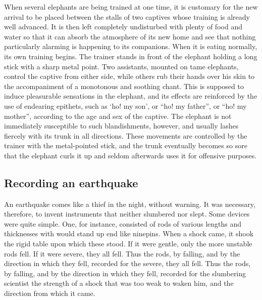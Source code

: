 \documentclass[11pt]{article}
\begin{document}
When several elephants are being trained at one time, it is customary for the new arrival to be placed between the stalls of two captives whose training is already well advanced. It is then left completely undisturbed with plenty of food and water so that it can absorb the atmosphere of its new home and see that nothing particularly alarming is happening to its companions. When it is eating normally, its own training begins. The trainer stands in front of the elephant holding a long stick with a sharp metal point. Two assistants, mounted on tame elephants, control the captive from either side, while others rub their hands over his skin to the accompaniment of a monotonous and soothing chant. This is supposed to induce pleasurable sensations in the elephant, and its effects are reinforced by the use of endearing epithets, such as `ho! my son', or ``ho! my father'', or ``ho! my mother'', according to the age and sex of the captive. The elephant is not immediately susceptible to such blandishments, however, and usually lashes fiercely with its trunk in all directions. These movements are controlled by the trainer with the metal-pointed stick, and the trunk eventually becomes so sore that the elephant curls it up and seldom afterwards uses it for offensive purposes.
\subsection{Recording an earthquake}
\label{sec-2-42}

An earthquake comes like a thief in the night, without warning. It was necessary, therefore, to invent instruments that neither slumbered nor slept. Some devices were quite simple. One, for instance, consisted of rods of various lengths and thicknesses with would stand up end like ninepins. When a shock came, it shook the rigid table upon which these stood. If it were gentle, only the more unstable rods fell. If it were severe, they all fell. Thus the rods, by falling, and by the direction in which they fell, recorded for the severe, they all fell. Thus the rods, by falling, and by the direction in which they fell, recorded for the slumbering scientist the strength of a shock that was too weak to waken him, and the direction from which it came.
\end{document}
